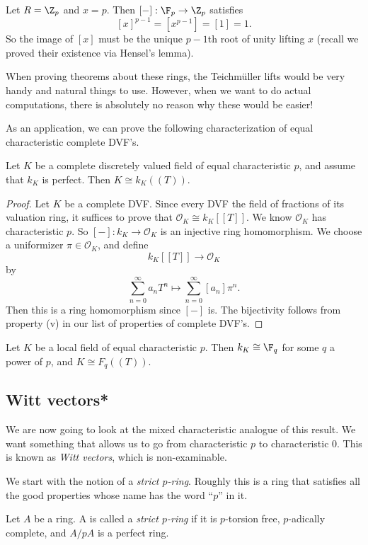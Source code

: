 \documentclass[a4paper]{article}
\begin{document}
\begin{eg}
  Let $R = \Z_p$ and $x = p$. Then $[-]: \F_p \to \Z_p$ satisfies
  \[
    [x]^{p - 1} = [x^{p - 1}] = [1] = 1.
  \]
  So the image of $[x]$ must be the unique $p - 1$th root of unity lifting $x$ (recall we proved their existence via Hensel's lemma).
\end{eg}

When proving theorems about these rings, the Teichm\"uller lifts would be very handy and natural things to use. However, when we want to do actual computations, there is absolutely no reason why these would be easier!

As an application, we can prove the following characterization of equal characteristic complete DVF's.
\begin{thm}
  Let $K$ be a complete discretely valued field of equal characteristic $p$, and assume that $k_K$ is perfect. Then $K \cong k_K((T))$.
\end{thm}

\begin{proof}
  Let $K$ be a complete DVF. Since every DVF the field of fractions of its valuation ring, it suffices to prove that $\mathcal{O}_K \cong k_K[[T]]$. We know $\mathcal{O}_K$ has characteristic $p$. So $[-]: k_K \to \mathcal{O}_K$ is an injective ring homomorphism. We choose a uniformizer $\pi \in \mathcal{O}_K$, and define
  \[
    k_K[[T]] \to \mathcal{O}_K
  \]
  by
  \[
    \sum_{n = 0}^\infty a_n T^n \mapsto \sum_{n = 0}^\infty [a_n] \pi^n.
  \]
  Then this is a ring homomorphism since $[-]$ is. The bijectivity follows from property (v) in our list of properties of complete DVF's.
\end{proof}

\begin{cor}
  Let $K$ be a local field of equal characteristic $p$. Then $k_K \cong \F_q$ for some $q$ a power of $p$, and $K \cong F_q((T))$.
\end{cor}

\subsection{Witt vectors*}
We are now going to look at the mixed characteristic analogue of this result. We want something that allows us to go from characteristic $p$ to characteristic $0$. This is known as \emph{Witt vectors}, which is non-examinable.

We start with the notion of a \emph{strict $p$-ring}. Roughly this is a ring that satisfies all the good properties whose name has the word ``$p$'' in it.
\begin{defi}
  Let $A$ be a ring. A is called a \emph{strict $p$-ring} if it is $p$-torsion free, $p$-adically complete, and $A/pA$ is a perfect ring.
\end{defi}
\end{document}
